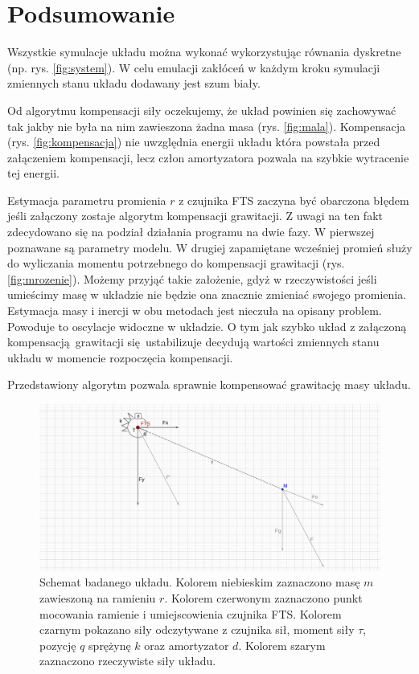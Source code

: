 \documentclass[a4paper, 10pt]{article}
\begin{document}
\section{Podsumowanie}
Wszystkie symulacje układu można wykonać wykorzystując równania dyskretne (np. rys. \ref{fig:system}). W celu emulacji zakłóceń w każdym kroku symulacji zmiennych stanu układu dodawany jest szum biały.

Od algorytmu kompensacji siły oczekujemy, że układ powinien się zachowywać tak jakby nie była na nim zawieszona żadna masa (rys. \ref{fig:mala}). Kompensacja (rys. \ref{fig:kompensacja}) nie uwzględnia energii układu która powstała przed załączeniem kompensacji, lecz człon amortyzatora pozwala na szybkie wytracenie tej energii. 

Estymacja parametru promienia $r$ z czujnika FTS zaczyna być obarczona błędem jeśli załączony zostaje algorytm kompensacji grawitacji. Z uwagi na ten fakt zdecydowano się na podział działania programu na dwie fazy. W pierwszej poznawane są parametry modelu. W drugiej zapamiętane wcześniej promień służy do wyliczania momentu potrzebnego do kompensacji grawitacji (rys. \ref{fig:mrozenie}). Możemy przyjąć takie założenie, gdyż w rzeczywistości jeśli umieścimy masę w układzie nie będzie ona znacznie zmieniać swojego promienia. Estymacja masy i inercji w obu metodach jest nieczuła na opisany problem. Powoduje to oscylacje widoczne w układzie. O tym jak szybko układ z załączoną kompensacją grawitacji się ustabilizuje decydują wartości zmiennych stanu układu w momencie rozpoczęcia kompensacji.


Przedstawiony algorytm pozwala sprawnie kompensować grawitację masy układu.




\begin{figure}[H]
	\includegraphics[width=0.99\linewidth]{2d}
	\centering
	\caption{Schemat badanego układu. Kolorem niebieskim zaznaczono masę $m$ zawieszoną na ramieniu $r$. Kolorem czerwonym zaznaczono punkt mocowania ramienie i umiejscowienia czujnika FTS. Kolorem czarnym pokazano siły odczytywane z czujnika sił, moment siły $\tau$, pozycję $q$ sprężynę $k$ oraz amortyzator $d$. Kolorem szarym zaznaczono rzeczywiste siły układu.}
	\label{fig:2d}
\end{figure}
\end{document}
